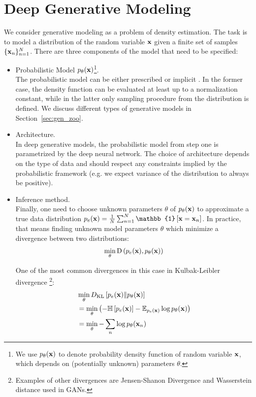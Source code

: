 \section{Deep Generative Modeling}
We consider generative modeling as a problem of density estimation.  The task is to model a distribution of the random variable ${\mathbf{x}}$ given a finite set of samples $\{{\mathbf{x}}_n\}_{n=1}^N$. There are three components of the model that need to be specified:
\begin{itemize}
\item Probabilistic Model $p_{\theta}({\mathbf{x}})$\footnote{
	We use $p_{\theta}({\mathbf{x}})$ to denote probability density function of random variable ${\mathbf{x}}$, which depends on (potentially unknown) parameters $\theta$. 
}.\\ 
The probabilistic model can be either prescribed or  implicit \citep{diggle1984monte}. In the former case, the density function can be evaluated at least up to a normalization constant, while in the latter only sampling procedure from the distribution is defined. We discuss different types of generative models in Section~\ref{sec:gen_zoo}.

\item Architecture.\\
In deep generative models, the probabilistic model from step one is parametrized by the deep neural network. The choice of architecture depends on the type of data and should respect any constraints implied by the probabilistic framework (e.g. we expect variance of the distribution to always be positive).

\item Inference method. \\
Finally, one need to choose unknown parameters $\theta$ of $p_{\theta}({\mathbf{x}})$ to approximate a true data distribution $p_e(\rvx)=\frac{1}{N} \sum_{n=1}^N \mathbb{1}\left[\rvx = \rvx_n\right]$. In practice, that means finding unknown model parameters $\theta$ which minimize a divergence between two distributions:
\begin{equation}
\begin{aligned}
\min_{\theta} \text{D}\left(p_{e}({\mathbf{x}}), p_{\theta}({\mathbf{x}})\right) 
\end{aligned}
\end{equation}

One of the most common divergences in this case in Kulbak-Leibler  divergence \footnote{Examples of other divergences are Jensen-Shanon Divergence and Wasserstein distance used in GANs.}:
\begin{equation}
\begin{aligned}
&\min_{\theta} D_{\mathrm{KL}}\left[p_{e}({\mathbf{x}})\|p_{\theta}({\mathbf{x}})\right] \\
& = \min_{\theta}  \left( - \mathbb{H}\left[p_{e}({\mathbf{x}})\right] - \mathbb{E}_{p_{e}({\mathbf{x}})}\log p_{\theta}({\mathbf{x}})\right)\\
& = \min_{\theta}  - \sum_{n}\log p_{\theta}({\mathbf{x}}_n)\\
\end{aligned}
\end{equation}


\end{itemize}
